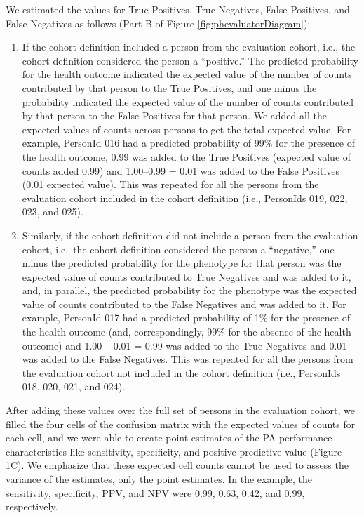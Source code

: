 \documentclass[11pt]{book}
\theoremstyle{definition}
\theoremstyle{definition}
\theoremstyle{definition}
\theoremstyle{remark}
\begin{document}
We estimated the values for True Positives, True Negatives, False
Positives, and False Negatives as follows (Part B of Figure
\ref{fig:phevaluatorDiagram}):

\begin{enumerate}
\def\labelenumi{\arabic{enumi}.}
\item
  If the cohort definition included a person from the evaluation cohort,
  i.e., the cohort definition considered the person a ``positive.'' The
  predicted probability for the health outcome indicated the expected
  value of the number of counts contributed by that person to the True
  Positives, and one minus the probability indicated the expected value
  of the number of counts contributed by that person to the False
  Positives for that person. We added all the expected values of counts
  across persons to get the total expected value. For example, PersonId
  016 had a predicted probability of 99\% for the presence of the health
  outcome, 0.99 was added to the True Positives (expected value of
  counts added 0.99) and 1.00--0.99 = 0.01 was added to the False
  Positives (0.01 expected value). This was repeated for all the persons
  from the evaluation cohort included in the cohort definition (i.e.,
  PersonIds 019, 022, 023, and 025).
\item
  Similarly, if the cohort definition did not include a person from the
  evaluation cohort, i.e.~the cohort definition considered the person a
  ``negative,'' one minus the predicted probability for the phenotype
  for that person was the expected value of counts contributed to True
  Negatives and was added to it, and, in parallel, the predicted
  probability for the phenotype was the expected value of counts
  contributed to the False Negatives and was added to it. For example,
  PersonId 017 had a predicted probability of 1\% for the presence of
  the health outcome (and, correspondingly, 99\% for the absence of the
  health outcome) and 1.00 -- 0.01 = 0.99 was added to the True
  Negatives and 0.01 was added to the False Negatives. This was repeated
  for all the persons from the evaluation cohort not included in the
  cohort definition (i.e., PersonIds 018, 020, 021, and 024).
\end{enumerate}

After adding these values over the full set of persons in the evaluation
cohort, we filled the four cells of the confusion matrix with the
expected values of counts for each cell, and we were able to create
point estimates of the PA performance characteristics like sensitivity,
specificity, and positive predictive value (Figure 1C). We emphasize
that these expected cell counts cannot be used to assess the variance of
the estimates, only the point estimates. In the example, the
sensitivity, specificity, PPV, and NPV were 0.99, 0.63, 0.42, and 0.99,
respectively.
\end{document}
